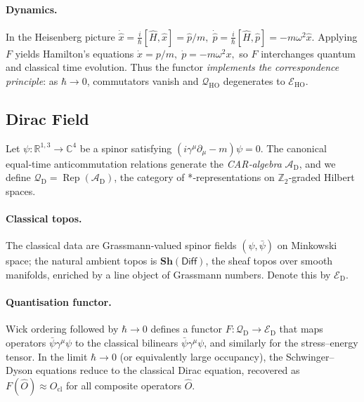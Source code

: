 \medskip

\paragraph{Dynamics.}
In the Heisenberg picture
\(
  \dot{\widehat x}=\tfrac{i}{\hbar}[\widehat H,\widehat x]=\widehat p/m,
  \;
  \dot{\widehat p}=\tfrac{i}{\hbar}[\widehat H,\widehat p]=-m\omega^{2}\widehat x.
\)
Applying $F$ yields Hamilton's equations
\(
  \dot x=p/m,\;
  \dot p=-m\omega^{2} x,
\)
so $F$ interchanges quantum and classical time evolution.  Thus the functor
\emph{implements the correspondence principle}: as $\hbar\to0$, commutators
vanish and $\mathcal Q_{\mathrm{HO}}$ degenerates to $\mathcal E_{\mathrm{HO}}$.

\bigskip

\subsection{Dirac Field}\label{subsec:Dirac}

Let $\psi\colon\mathbb R^{1,3}\to\mathbb C^{4}$ be a spinor satisfying
\(
  (i\gamma^{\mu}\partial_{\mu}-m)\psi=0.
\)
The canonical equal‑time anticommutation relations generate the
\emph{CAR‑algebra} $\mathcal A_{\mathrm{D}}$, and we define
$\mathcal Q_{\mathrm{D}}=\operatorname{Rep}(\mathcal A_{\mathrm{D}})$, the
category of *‑representations on $\mathbb Z_{2}$‑graded Hilbert spaces.

\medskip

\paragraph{Classical topos.}
The classical data are Grassmann‑valued spinor fields
$(\psi,\bar\psi)$ on Minkowski space; the natural ambient topos is
$\mathbf{Sh}(\mathsf{Diff})$, the sheaf topos over smooth manifolds, enriched
by a line object of Grassmann numbers.  Denote this by $\mathcal E_{\mathrm{D}}$.

\medskip

\paragraph{Quantisation functor.}
Wick ordering followed by $\hbar\to0$ defines a functor
$F\colon\mathcal Q_{\mathrm{D}}\to\mathcal E_{\mathrm{D}}$ that maps operators
$\bar\psi\gamma^{\mu}\psi$ to the classical bilinears
$\bar\psi\gamma^{\mu}\psi$, and similarly for the stress–energy tensor.
In the limit $\hbar\to0$ (or equivalently large occupancy), the Schwinger–Dyson
equations reduce to the classical Dirac equation, recovered as
$F(\widehat O)\approx O_{\mathrm{cl}}$ for all composite operators
$\widehat O$.


